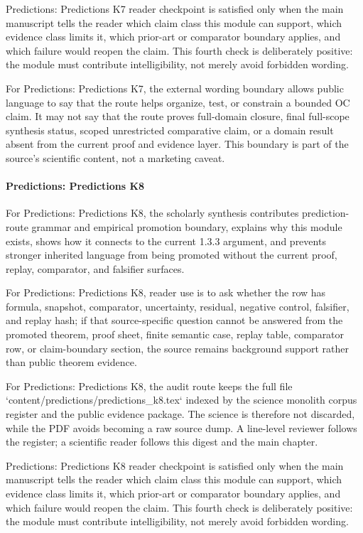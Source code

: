 Predictions: Predictions K7 reader checkpoint is satisfied only when the main manuscript tells the reader which claim class this module can support, which evidence class limits it, which prior-art or comparator boundary applies, and which failure would reopen the claim. This fourth check is deliberately positive: the module must contribute intelligibility, not merely avoid forbidden wording.


For Predictions: Predictions K7, the external wording boundary allows public language to say that the route helps organize, test, or constrain a bounded OC claim. It may not say that the route proves full-domain closure, final full-scope synthesis status, scoped unrestricted comparative claim, or a domain result absent from the current proof and evidence layer. This boundary is part of the source's scientific content, not a marketing caveat.


\paragraph{Predictions: Predictions K8}

For Predictions: Predictions K8, the scholarly synthesis contributes prediction-route grammar and empirical promotion boundary, explains why this module exists, shows how it connects to the current 1.3.3 argument, and prevents stronger inherited language from being promoted without the current proof, replay, comparator, and falsifier surfaces.


For Predictions: Predictions K8, reader use is to ask whether the row has formula, snapshot, comparator, uncertainty, residual, negative control, falsifier, and replay hash; if that source-specific question cannot be answered from the promoted theorem, proof sheet, finite semantic case, replay table, comparator row, or claim-boundary section, the source remains background support rather than public theorem evidence.


For Predictions: Predictions K8, the audit route keeps the full file `content/predictions/predictions\_k8.tex` indexed by the science monolith corpus register and the public evidence package. The science is therefore not discarded, while the PDF avoids becoming a raw source dump. A line-level reviewer follows the register; a scientific reader follows this digest and the main chapter.


Predictions: Predictions K8 reader checkpoint is satisfied only when the main manuscript tells the reader which claim class this module can support, which evidence class limits it, which prior-art or comparator boundary applies, and which failure would reopen the claim. This fourth check is deliberately positive: the module must contribute intelligibility, not merely avoid forbidden wording.


